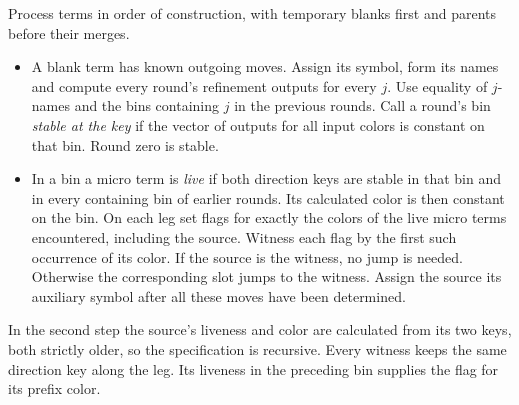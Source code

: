Process terms in order of construction, with temporary blanks first and
parents before their merges.
\begin{itemize}
\item A blank term has known outgoing moves. Assign its symbol, form
its names and compute every round's refinement outputs for every \(j\).
Use equality of \(j\)-names and the bins containing \(j\) in the
previous rounds. Call a round's bin \emph{stable at the key} if the vector
of outputs for all input colors is constant on that bin. Round zero is
stable.
\item In a bin a micro term is \emph{live} if both direction keys are
stable in that bin and in every containing bin of earlier rounds. Its
calculated color is then constant on the bin. On each leg set flags for
exactly the colors of the live micro terms encountered, including the
source. Witness each flag by the first such occurrence of its color.
If the source is the witness, no jump is needed. Otherwise the
corresponding slot jumps to the witness. Assign the source its auxiliary
symbol after all these moves have been determined.
\end{itemize}
In the second step the source's liveness and color are calculated from
its two keys, both strictly older, so the specification is recursive.
Every witness keeps the same direction key along the leg. Its liveness
in the preceding bin supplies the flag for its prefix color.


